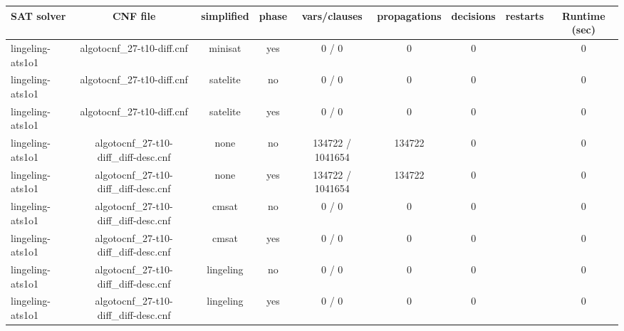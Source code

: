 \begin{appendices}
\begin{table}[p]
  \begin{center}
    \begin{tabular}{l|cccccccc}
        \textbf{SAT solver} & \textbf{CNF file} & \textbf{simplified} & \textbf{phase} & \textbf{vars/clauses} & \textbf{propagations} & \textbf{decisions} & \textbf{restarts} & \textbf{Runtime (sec)} \\
      \hline
  lingeling-ats1o1               & algotocnf\_27-t10-diff.cnf     & minisat    & yes   & 0 / 0      & 0         & 0         &            & 0 \\ %
  lingeling-ats1o1               & algotocnf\_27-t10-diff.cnf     & satelite   & no    & 0 / 0      & 0         & 0         &            & 0 \\ %
  lingeling-ats1o1               & algotocnf\_27-t10-diff.cnf     & satelite   & yes   & 0 / 0      & 0         & 0         &            & 0 \\ %
  lingeling-ats1o1               & algotocnf\_27-t10-diff\_diff-desc.cnf & none       & no    & 134722 / 1041654 & 134722    & 0         &            & 0 \\ %
  lingeling-ats1o1               & algotocnf\_27-t10-diff\_diff-desc.cnf & none       & yes   & 134722 / 1041654 & 134722    & 0         &            & 0 \\ %
  lingeling-ats1o1               & algotocnf\_27-t10-diff\_diff-desc.cnf & cmsat      & no    & 0 / 0      & 0         & 0         &            & 0 \\ %
  lingeling-ats1o1               & algotocnf\_27-t10-diff\_diff-desc.cnf & cmsat      & yes   & 0 / 0      & 0         & 0         &            & 0 \\ %
  lingeling-ats1o1               & algotocnf\_27-t10-diff\_diff-desc.cnf & lingeling  & no    & 0 / 0      & 0         & 0         &            & 0 \\ %
  lingeling-ats1o1               & algotocnf\_27-t10-diff\_diff-desc.cnf & lingeling  & yes   & 0 / 0      & 0         & 0         &            & 0 \\ %

\end{tabular}
\end{center}
\end{table}
\end{appendices}
